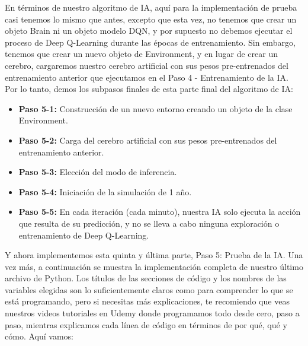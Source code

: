 \documentclass[]{book}
\providecommand{\tightlist}{%
  \setlength{\itemsep}{0pt}\setlength{\parskip}{0pt}}
\begin{document}
En términos de nuestro algoritmo de IA, aquí para la implementación de prueba casi tenemos lo mismo que antes, excepto que esta vez, no tenemos que crear un objeto Brain ni un objeto modelo DQN, y por supuesto no debemos ejecutar el proceso de Deep Q-Learning durante las épocas de entrenamiento. Sin embargo, tenemos que crear un nuevo objeto de Environment, y en lugar de crear un cerebro, cargaremos nuestro cerebro artificial con sus pesos pre-entrenados del entrenamiento anterior que ejecutamos en el Paso 4 - Entrenamiento de la IA. Por lo tanto, demos los subpasos finales de esta parte final del algoritmo de IA:

\begin{itemize}
\tightlist
\item
  \textbf{Paso 5-1:} Construcción de un nuevo entorno creando un objeto de la clase Environment.
\item
  \textbf{Paso 5-2:} Carga del cerebro artificial con sus pesos pre-entrenados del entrenamiento anterior.
\item
  \textbf{Paso 5-3:} Elección del modo de inferencia.
\item
  \textbf{Paso 5-4:} Iniciación de la simulación de 1 año.
\item
  \textbf{Paso 5-5:} En cada iteración (cada minuto), nuestra IA solo ejecuta la acción que resulta de su predicción, y no se lleva a cabo ninguna exploración o entrenamiento de Deep Q-Learning.
\end{itemize}

Y ahora implementemos esta quinta y última parte, Paso 5: Prueba de la IA. Una vez más, a continuación se muestra la implementación completa de nuestro último archivo de Python. Los títulos de las secciones de código y los nombres de las variables elegidas son lo suficientemente claros como para comprender lo que se está programando, pero si necesitas más explicaciones, te recomiendo que veas nuestros videos tutoriales en Udemy donde programamos todo desde cero, paso a paso, mientras explicamos cada línea de código en términos de por qué, qué y cómo. Aquí vamos:
\end{document}
